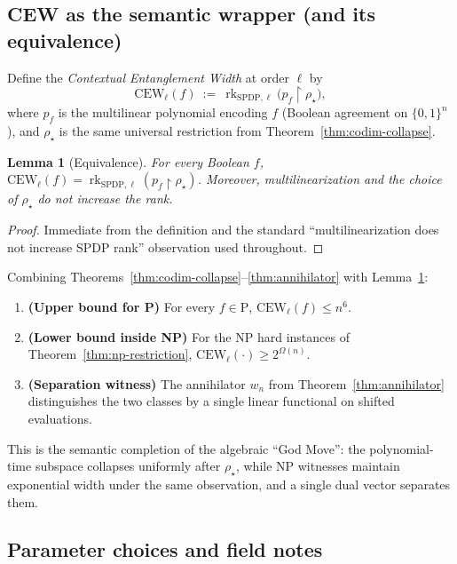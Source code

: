 \documentclass[12pt]{article}
\newtheorem{lemma}[theorem]{Lemma}
\theoremstyle{definition}
\theoremstyle{definition}
\theoremstyle{remark}
\theoremstyle{remark}
\begin{document}
\subsection{CEW as the semantic wrapper (and its equivalence)}

Define the \emph{Contextual Entanglement Width} at order $\ell$ by
\[
\mathrm{CEW}_\ell(f)\ :=\ \operatorname{rk}_{\mathrm{SPDP},\ell}\!\big(p_f\!\upharpoonright\!\rho_\star\big),
\]
where $p_f$ is the multilinear polynomial encoding $f$ (Boolean agreement on $\{0,1\}^n$), and $\rho_\star$ is the same universal restriction from Theorem~\ref{thm:codim-collapse}.

\begin{lemma}[Equivalence]\label{lem:cew-equiv}
For every Boolean $f$, $\mathrm{CEW}_\ell(f)=\operatorname{rk}_{\mathrm{SPDP},\ell}(p_f\!\upharpoonright\!\rho_\star)$. Moreover, multilinearization and the choice of $\rho_\star$ do not increase the rank.
\end{lemma}

\begin{proof}
Immediate from the definition and the standard ``multilinearization does not increase SPDP rank'' observation used throughout.
\end{proof}

Combining Theorems~\ref{thm:codim-collapse}--\ref{thm:annihilator} with Lemma~\ref{lem:cew-equiv}:
\begin{enumerate}
\item \textbf{(Upper bound for P)} For every $f\in\mathrm{P}$, $\mathrm{CEW}_\ell(f)\le n^6$.
\item \textbf{(Lower bound inside NP)} For the NP hard instances of Theorem~\ref{thm:np-restriction}, $\mathrm{CEW}_\ell(\cdot)\ge 2^{\Omega(n)}$.
\item \textbf{(Separation witness)} The annihilator $w_n$ from Theorem~\ref{thm:annihilator} distinguishes the two classes by a single linear functional on shifted evaluations.
\end{enumerate}

This is the semantic completion of the algebraic ``God Move'': the polynomial-time subspace collapses uniformly after $\rho_\star$, while NP witnesses maintain exponential width under the same observation, and a single dual vector separates them.

\subsection{Parameter choices and field notes}
\end{document}
